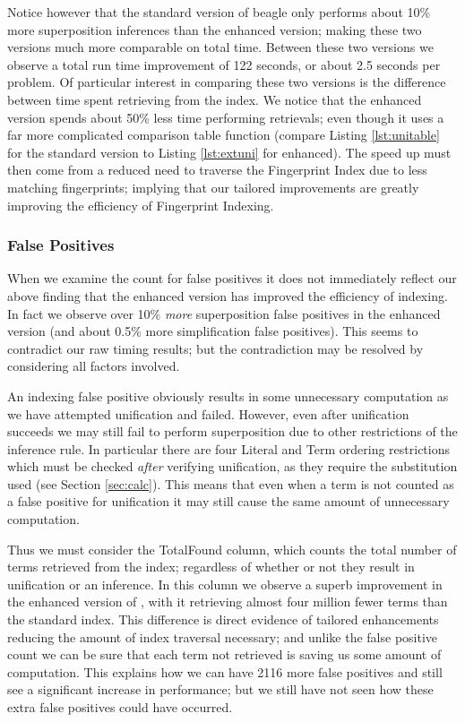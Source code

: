 Notice however that the standard version of beagle only performs about 10\% more
superposition inferences than the enhanced version; making these two versions much more comparable
on total time. Between these two versions we observe a total run time improvement
of 122 seconds, or about 2.5 seconds per problem. Of particular interest in comparing
these two versions is the difference between time spent retrieving from the index.
We notice that the enhanced version spends about 50\% less time performing retrievals;
even though it uses a far more complicated comparison table function (compare Listing
\ref{lst:unitable} for the standard version to Listing \ref{lst:extuni} for enhanced).
The speed up must then come from a reduced need to traverse the Fingerprint Index
due to less matching fingerprints; implying that our tailored improvements are greatly
improving the efficiency of Fingerprint Indexing.


\subsubsection{False Positives}
When we examine the count for false positives it does not immediately reflect our
above finding that the enhanced version has improved the efficiency of indexing.
In fact we observe over 10\% \emph{more} superposition false positives in the enhanced
version (and about 0.5\% more simplification false positives). This seems to contradict
our raw timing results; but the contradiction may be resolved by considering all factors involved.

An indexing false positive obviously results in some unnecessary computation as we
have attempted unification and failed. However, even after unification succeeds we may
still fail to perform superposition due to other restrictions of the inference rule.
In particular there are four Literal and Term ordering restrictions which must
be checked \emph{after} verifying unification, as they require the substitution
used (see Section \ref{sec:calc}). This means that even when a term
is not counted as a false positive for unification it may still cause the same
amount of unnecessary computation.

Thus we must consider the TotalFound column, which counts the total number of terms
retrieved from the index; regardless of whether or not they result in unification or an inference.
In this column we observe a superb improvement in the enhanced version
of \beagle, with it retrieving almost four million fewer terms than the standard index.
This difference is direct evidence of tailored enhancements reducing the amount of index traversal necessary;
and unlike the false positive count we can be sure that each term not retrieved
is saving us some amount of computation. This explains how we can have 2116 more
false positives and still see a significant increase in performance; but we still
have not seen how these extra false positives could have occurred.

